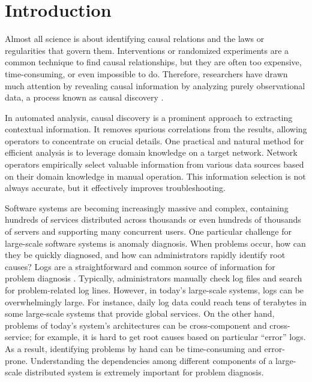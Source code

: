 \section{Introduction}
Almost all science is about identifying causal relations and the laws or regularities that govern them. Interventions or randomized experiments are a common technique to find causal relationships, but they are often too expensive, time-consuming, or even impossible to do. Therefore, researchers have drawn much attention by revealing causal information by analyzing purely observational data, a process known as causal discovery \cite{spirtes2000causation}. \newline

In automated analysis, causal discovery is a prominent approach to extracting contextual information. It removes spurious correlations from the results, allowing operators to concentrate on crucial details. One practical and natural method for efficient analysis is to leverage domain knowledge on a target network. Network operators empirically select valuable information from various data sources based on their domain knowledge in manual operation. This information selection is not always accurate, but it effectively improves troubleshooting. \newline

Software systems are becoming increasingly massive and complex, containing hundreds of services distributed across thousands or even hundreds of thousands of servers and supporting many concurrent users. One particular challenge for large-scale software systems is anomaly diagnosis. When problems occur, how can they be quickly diagnosed, and how can administrators rapidly identify root causes? Logs are a straightforward and common source of information for problem diagnosis \cite{aussel2018improving,du2017deeplog,otomo2019latent}. Typically, administrators manually check log files and search for problem-related log lines. However, in today’s large-scale systems, logs can be overwhelmingly large. For instance, daily log data could reach tens of terabytes in some large-scale systems that provide global services. On the other hand, problems of today’s system’s architectures can be cross-component and cross-service; for example, it is hard to get root causes based on particular “error” logs. As a result, identifying problems by hand can be time-consuming and error-prone. Understanding the dependencies among different components of a large-scale distributed system is extremely important for problem diagnosis.

